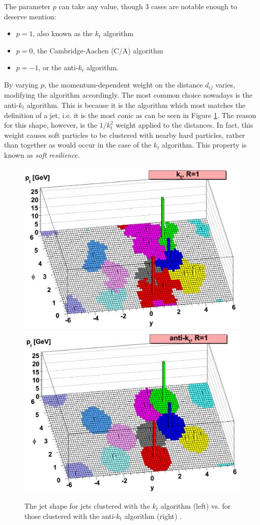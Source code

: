 \documentclass[10pt,a4paper]{book}
\begin{document}
The parameter $p$ can take any value, though 3 cases are notable enough to deserve mention:
\begin{itemize}
    \item $p = 1$, also known as the $k_t$ algorithm
    \item $p = 0$, the Cambridge-Aachen (C/A) algorithm
    \item $p = -1$, or the anti-$k_t$ algorithm.
\end{itemize}
By varying $p$, the momentum-dependent weight on the distance $d_{ij}$ varies, modifying the algorithm accordingly. The most common choice nowadays is the anti-$k_t$ algorithm. This is because it is the algorithm which most matches the definition of a jet, i.e. it is the most conic as can be seen in Figure \ref{jet shapes}. The reason for this shape, however, is the $1/k_t^2$ weight applied to the distances. In fact, this weight causes soft particles to be clustered with nearby hard particles, rather than together as would occur in the case of the $k_t$ algorithm. This property is known as \emph{soft resilience.}

\begin{figure}
    \centering
    \includegraphics[width=0.49\linewidth]{theory chapter/kt.png}
    \includegraphics[width=0.49\linewidth]{theory chapter/anti-kt.png}

    \caption{The jet shape for jets clustered with the $k_t$ algorithm (left) vs. for those clustered with the anti-$k_t$ algorithm (right) \cite{Cacciari:2008gp}.}
    \label{jet shapes}
\end{figure}
\end{document}
